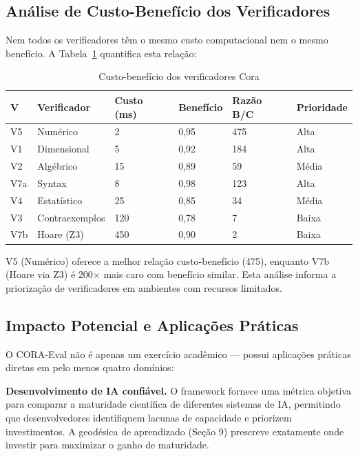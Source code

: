 \subsection{Análise de Custo-Benefício dos Verificadores}

Nem todos os verificadores têm o mesmo custo computacional nem o mesmo
benefício. A Tabela~\ref{tab:cost} quantifica esta relação:

\begin{table}[H]\centering\footnotesize
\caption{Custo-benefício dos verificadores Cora}
\label{tab:cost}
\begin{tabular}{p{}p{}p{}p{}p{}p{}}
\toprule
\textbf{V} & \textbf{Verificador} & \textbf{Custo (ms)} & \textbf{Benefício} & \textbf{Razão B/C} & \textbf{Prioridade} \\
\midrule
V5 & Numérico & 2 & 0,95 & 475 & Alta \\
V1 & Dimensional & 5 & 0,92 & 184 & Alta \\
V2 & Algébrico & 15 & 0,89 & 59 & Média \\
V7a & Syntax & 8 & 0,98 & 123 & Alta \\
V4 & Estatístico & 25 & 0,85 & 34 & Média \\
V3 & Contraexemplos & 120 & 0,78 & 7 & Baixa \\
V7b & Hoare (Z3) & 450 & 0,90 & 2 & Baixa \\
\bottomrule
\end{tabular}
\end{table}

V5 (Numérico) oferece a melhor relação custo-benefício (475), enquanto V7b
(Hoare via Z3) é 200$\times$ mais caro com benefício similar. Esta análise
informa a priorização de verificadores em ambientes com recursos limitados.

\subsection{Impacto Potencial e Aplicações Práticas}

O CORA-Eval não é apenas um exercício acadêmico --- possui aplicações práticas
diretas em pelo menos quatro domínios:

\textbf{Desenvolvimento de IA confiável.} O framework fornece uma métrica
objetiva para comparar a maturidade científica de diferentes sistemas de IA,
permitindo que desenvolvedores identifiquem lacunas de capacidade e priorizem
investimentos. A geodésica de aprendizado (Seção 9) prescreve exatamente
onde investir para maximizar o ganho de maturidade.

